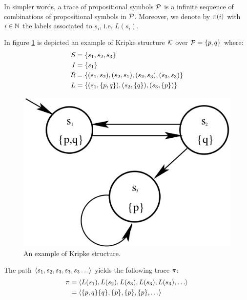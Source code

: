 In simpler words, a trace of propositional symbols $\mathcal{P}$ is a infinite sequence of combinations of propositional symbols in $\mathcal{P}$. Moreover, we denote by $\pi(i)$ with $i\in\mathbb{N}$ the labels associated to $s_i$, i.e. $L(s_i)$.
\begin{example}\label{kripke-example}
	In figure \ref{kripke-fig-example} is depicted an example of Kripke structure $\mathcal{K}$ over $\mathcal{P} = \{p, q\}$ where:
	\begin{align*}
	S &= \{s_1, s_2, s_3\}\\
	I &= \{s_1\}\\
	R &= \{(s_1, s_2), (s_2, s_1), (s_2, s_3), (s_3, s_3)\}\\
	L &= \{(s_1, \{p, q\}), (s_2, \{q\}), (s_3, \{p\})\}
	\end{align*}
	 
	\begin{figure}[h]
		\centering	
		\includegraphics[width=.5\linewidth]{images/KripkeStructureExample}
		\caption{\label{kripke-fig-example}An example of Kripke structure.}
	\end{figure}
	
	The path $\tup{s_1, s_2, s_3, s_3, s_3\dots}$ yields the following trace $\pi$:
	\begin{align*}
	\trace &= \tup{L(s_1), L(s_2), L(s_3), L(s_3), L(s_3),\dots} \\
		&= \tup{\set{p, q}\set{q}, \set{p}, \set{p},\set{p}, \dots}
	\end{align*}
\end{example}





